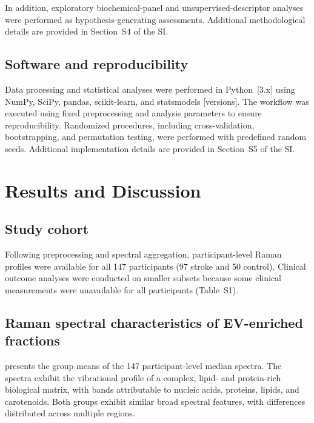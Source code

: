 \documentclass[preprint,12pt]{elsarticle}
\begin{document}
In addition, exploratory biochemical-panel and unsupervised-descriptor analyses were performed as hypothesis-generating assessments. Additional methodological details are provided in Section~S4 of the SI.


\subsection{Software and reproducibility}
\label{subsec:software}

Data processing and statistical analyses were performed in Python~{\color{red}[3.x]} using NumPy, SciPy, pandas, scikit-learn, and statsmodels {\color{red}[versions]}. The workflow was executed using fixed preprocessing and analysis parameters to ensure reproducibility. Randomized procedures, including cross-validation, bootstrapping, and permutation testing, were performed with predefined random seeds. Additional implementation details are provided in Section~S5 of the SI.


\section{Results and Discussion} 
\label{sec:results}

\subsection{Study cohort}

Following preprocessing and spectral aggregation, participant-level Raman profiles were available for all 147 participants (97 stroke and 50 control). Clinical outcome analyses were conducted on smaller subsets because some clinical measurements were unavailable for all participants (Table~S1).


\subsection{Raman spectral characteristics of EV-enriched fractions}

 presents the group means of the 147 participant-level median spectra. The spectra exhibit the vibrational profile of a complex, lipid- and protein-rich biological matrix, with bands attributable to nucleic acids, proteins, lipids, and carotenoids. Both groups exhibit similar broad spectral features, with differences distributed across multiple regions.
\end{document}
